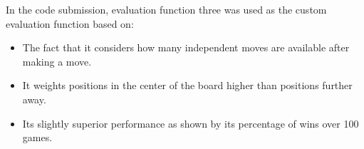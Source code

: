 \documentclass[11pt]{article}
\begin{document}
In the code submission, evaluation function three was used as the custom evaluation function based on:

\begin{itemize}
\item The fact that it considers how many independent moves are available after making a move.
\item It weights positions in the center of the board higher than positions further away.
\item Its slightly superior performance as shown by its percentage of wins over 100 games.
\end{itemize}
\end{document}
